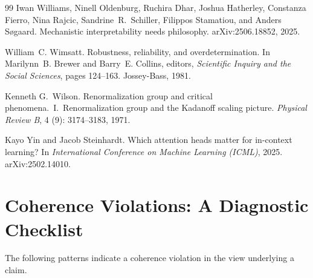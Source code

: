\documentclass{article}
\begin{document}
\begin{thebibliography}{99}
Iwan Williams, Ninell Oldenburg, Ruchira Dhar, Joshua Hatherley, Constanza
  Fierro, Nina Rajcic, Sandrine~R.\ Schiller, Filippos Stamatiou, and Anders
  S{\o}gaard.
\newblock Mechanistic interpretability needs philosophy.
\newblock arXiv:2506.18852, 2025.

William~C. Wimsatt.
\newblock Robustness, reliability, and overdetermination.
\newblock In Marilynn~B. Brewer and Barry~E. Collins, editors, \emph{Scientific
  Inquiry and the Social Sciences}, pages 124--163. Jossey-Bass, 1981.

Kenneth G.\ Wilson.
\newblock Renormalization group and critical phenomena.\ {I}.\ Renormalization
  group and the {Kadanoff} scaling picture.
\newblock \emph{Physical Review B}, 4 (9): 3174--3183, 1971.

Kayo Yin and Jacob Steinhardt.
\newblock Which attention heads matter for in-context learning?
\newblock In \emph{International Conference on Machine Learning (ICML)}, 2025.
\newblock arXiv:2502.14010.

\end{thebibliography}

\newpage
\appendix
\section{Coherence Violations: A Diagnostic Checklist}\label{app:checklist}

The following patterns indicate a coherence violation in the view
underlying a claim.
\end{document}
